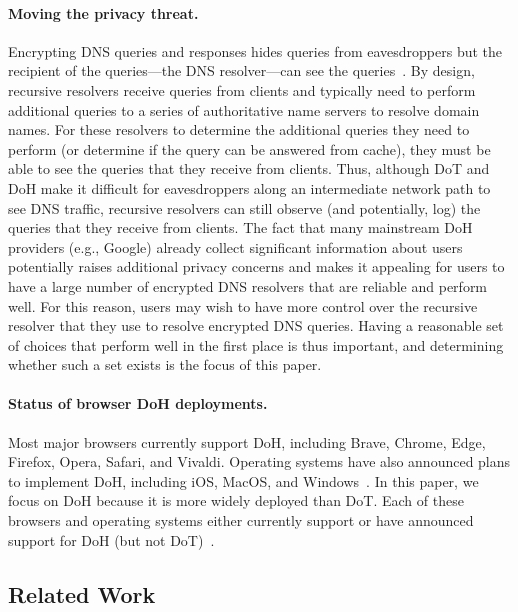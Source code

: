 \paragraph{Moving the privacy threat.} Encrypting DNS queries and responses hides queries
from eavesdroppers but the recipient of the queries---the DNS resolver---can
see the queries~\cite{IEEEfight}. By design, recursive resolvers receive
queries from clients and typically need to perform additional queries to a
series of authoritative name servers to resolve domain names.  For these
resolvers to determine the additional queries they need to perform (or
determine if the query can be answered from cache), they must be able to see
the queries that they receive from clients.  Thus, although DoT and DoH make
it difficult for eavesdroppers along an intermediate network path to see DNS
traffic, recursive resolvers can still observe (and potentially, log) the
queries that they receive from clients.  The fact that many mainstream DoH
providers (e.g., Google) already collect significant information about users
potentially raises additional privacy concerns and makes it appealing for
users to have a large number of encrypted DNS resolvers that are reliable and
perform well. For this reason, users may wish to have more control over the
recursive resolver that they use to resolve encrypted DNS queries. Having
a reasonable set of choices that perform well in the first place is thus
important, and determining whether such a set exists is the focus of this
paper.

\paragraph{Status of browser DoH deployments.}
Most major browsers currently support DoH, including Brave, Chrome, Edge,
Firefox, Opera, Safari, and Vivaldi.  Operating systems have also announced
plans to implement DoH, including iOS, MacOS, and
Windows~\cite{ffSettings,operaEdgeSettings,vivaldiSettings,iosSettings,jensen2020windows}.
In this paper, we focus on DoH because it is more widely deployed
than DoT.  Each of these browsers and operating systems either
currently support or have announced support for DoH (but not
DoT)~\cite{lack-of-dot-support}.

\subsection{Related Work}

